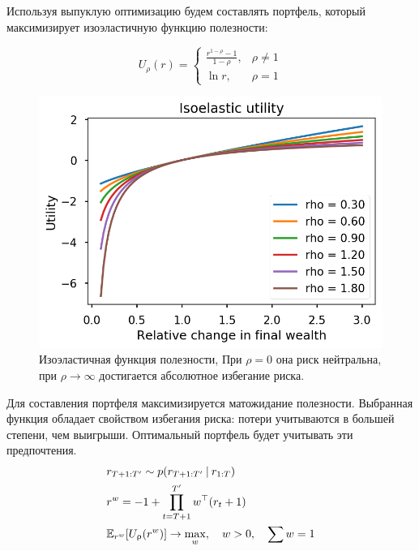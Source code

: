 Используя выпуклую оптимизацию будем составлять портфель, который максимизирует изоэластичную функцию полезности:

\begin{minipage}{0.4\linewidth}
\begin{equation}
U_\rho(r) = \begin{cases}
\frac{r^{1-\rho}-1}{1-\rho}, &\rho\ne 1\\
\ln r, &\rho = 1
\end{cases}
\label{eq:isoelastic}
\end{equation}
\end{minipage}
\begin{minipage}{0.5\linewidth}
	\begin{figure}[H]
		\centering
		\includegraphics[width=0.7\linewidth]{Thesis/images/isoelastic}
		\caption{Изоэластичная функция полезности, При $\rho=0$ она риск нейтральна, при $\rho \to \infty$ достигается абсолютное избегание риска.}
		\label{fig:isoelastic}	
	\end{figure}
\end{minipage}
\vspace{.5cm}

 Для составления портфеля максимизируется  матожидание полезности. Выбранная функция обладает свойством избегания риска: потери учитываются в большей степени, чем выигрыши. Оптимальный портфель будет учитывать эти предпочтения.
\begin{align}
&r_{T+1:T'} \sim p(r_{T+1:T'}\cond r_{1:T})\\
&r^w = -1 + \prod_{t=T+1}^{T'} w^\top(r_t + 1)\\
&\Eb[r^w]{U_\rho(r^w)} \to \max_w, \quad w>0,\quad \sum w = 1
\end{align}
